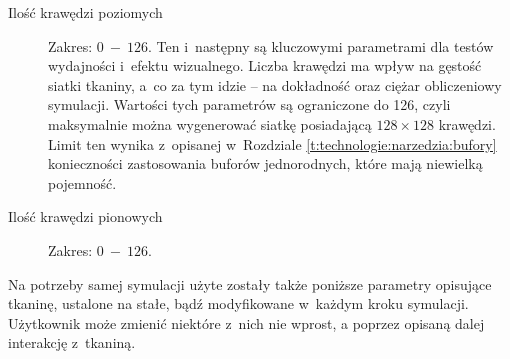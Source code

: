 \begin{description}
				\item[Ilość krawędzi poziomych] Zakres: \(0\ -\ 126\). Ten i~następny są kluczowymi parametrami dla testów wydajności i~efektu wizualnego. Liczba krawędzi ma wpływ na gęstość siatki tkaniny, a~co za tym idzie -- na dokładność oraz ciężar obliczeniowy symulacji. Wartości tych parametrów są ograniczone do 126, czyli maksymalnie można wygenerować siatkę posiadającą \( 128 \times 128 \) krawędzi. Limit ten wynika z~opisanej w~Rozdziale \ref{t:technologie:narzedzia:bufory} konieczności zastosowania buforów jednorodnych, które mają niewielką pojemność.
				
				\item[Ilość krawędzi pionowych] Zakres: \(0\ -\ 126\).
				
			\end{description}
			
			Na potrzeby samej symulacji użyte zostały także poniższe parametry opisujące tkaninę, ustalone na stałe, bądź modyfikowane w~każdym kroku symulacji. Użytkownik może zmienić niektóre z~nich nie wprost, a poprzez opisaną dalej interakcję z~tkaniną.
			
